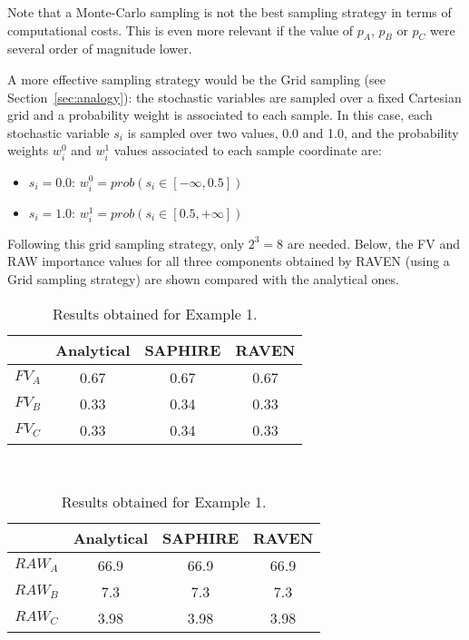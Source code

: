 Note that a Monte-Carlo sampling is not the best sampling strategy in terms of computational 
costs. This is even more relevant if the value of $p_A$, $p_B$ or $p_C$ were several order of 
magnitude lower. 

A more effective sampling strategy would be the Grid sampling (see Section~\ref{sec:analogy}): 
the stochastic variables 
are sampled over a fixed Cartesian grid and a probability weight is associated to each sample. 
In this case, each stochastic variable $s_i$ is sampled over two values, 0.0 and 1.0, and the 
probability weights $w_i^0$ and $w_i^1$ values associated to each sample coordinate are:
\begin{itemize}
  \item $s_i=0.0$: $w_i^0=prob(s_i \in [-\infty,0.5])$
  \item $s_i=1.0$: $w_i^1=prob(s_i \in [0.5,+\infty])$
\end{itemize}
Following this grid sampling strategy, only $2^3=8$ are needed.
Below, the FV and RAW importance values for all three components obtained by RAVEN (using a 
Grid sampling strategy) are shown compared with the analytical ones.

\begin{table}
    \caption{Results obtained for Example 1.}
    \centering
    \begin{minipage}{.5\linewidth}
      \centering
      \begin{tabular}{c | c | c | c} 
        \hline 
         & Analytical & SAPHIRE & RAVEN \\ 
        \hline 
        $FV_A$ & 0.67 & 0.67 & 0.67  \\
        $FV_B$ & 0.33 & 0.34 & 0.33   \\
        $FV_C$ & 0.33 & 0.34 & 0.33   \\
        \hline 
      \end{tabular}
    \end{minipage}\\
    \begin{minipage}{.5\linewidth}
      \centering
      \begin{tabular}{c | c | c | c} 
        \hline 
         & Analytical & SAPHIRE & RAVEN \\ 
        \hline 
        $RAW_A$ & 66.9  & 66.9 & 66.9  \\
        $RAW_B$ & 7.3  & 7.3 & 7.3   \\
        $RAW_C$ & 3.98 & 3.98 & 3.98   \\
        \hline 
      \end{tabular}
    \end{minipage} 
\end{table}

